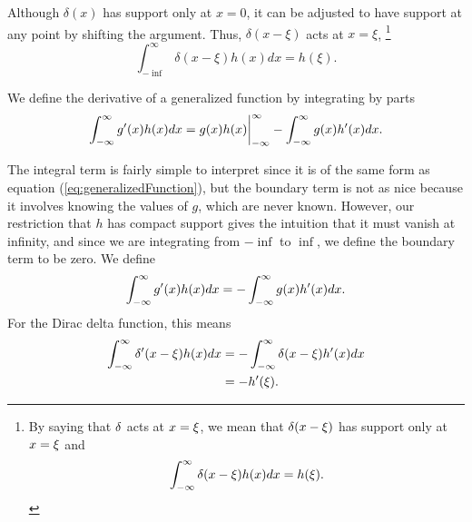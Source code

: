 Although \(\delta(x)\) has support only at \(x=0\), it can be adjusted to have support at any point by shifting the argument. Thus, \(\delta(x-\xi)\) acts at \(x=\xi\), \footnote{By saying that \(\delta\) acts at \(x=\xi\), we mean that \(\delta(x-\xi)\) has support only at \(x=\xi\) and 
\begin{equation*}
    \int_{-\infty}^{\infty} \delta(x - \xi )h(x) dx = h(\xi).
\end{equation*} }
\begin{equation}
    \int_{-\inf}^{\infty} \delta(x-\xi)h(x)dx = h(\xi).
\end{equation}

\begin{definition}
    We define the derivative of a generalized function by integrating by parts
    \begin{equation}
            \int_{-\infty}^{\infty} g'(x)h(x) dx= g(x)h(x)\biggr\rvert_{-\infty}^{\infty} - \int_{-\infty}^{\infty} g(x)h'(x)dx.
    \end{equation}
\end{definition}
The integral term is fairly simple to interpret since it is of the same form as equation (\ref{eq:generalizedFunction}), but the boundary term is not as nice because it involves knowing the values of \(g\), which are never known. However, our restriction that \(h\) has compact support gives the intuition that it must vanish at infinity, and since we are integrating from \(-\inf\) to \(\inf\), we define the boundary term to be zero. We define
\begin{equation}
    \int_{-\infty}^{\infty} g'(x)h(x)dx = -\int_{-\infty}^{\infty} g(x)h'(x)dx.
\end{equation}
For the Dirac delta function, this means
\begin{equation}
    \begin{split} \label{eq:deltafirst}
        \int_{-\infty}^{\infty} \delta'(x-\xi)h(x)dx &= -\int_{-\infty}^{\infty}\delta(x-\xi)h'(x)dx\\
        &=-h'(\xi).
    \end{split}
\end{equation}


